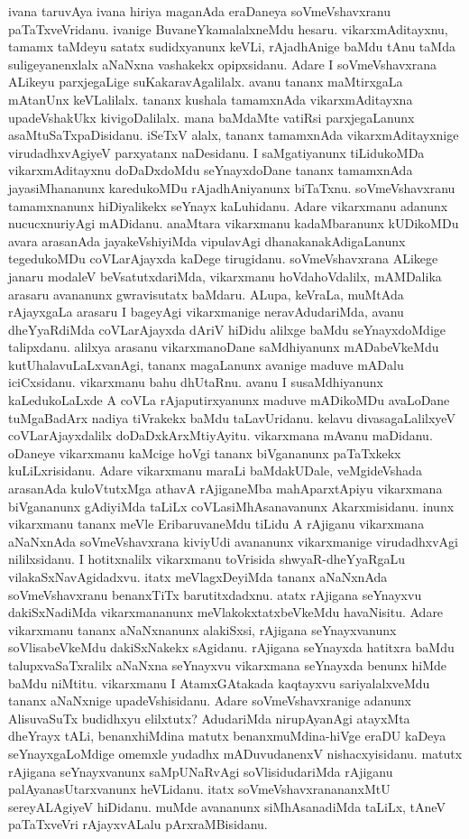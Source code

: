 \documentclass[11pt,a4size]{article}
\begin{document}
ivana taruvAya ivana hiriya maganAda eraDaneya soVmeVshavxranu
paTaTxveVridanu. ivanige BuvaneYkamalalxneMdu
hesaru. vikarxmAditayxnu, tamamx taMdeyu satatx sudidxyanunx keVLi,
rAjadhAnige baMdu tAnu taMda suligeyanenxlalx aNaNxna vashakekx
opipxsidanu. Adare I soVmeVshavxrana ALikeyu parxjegaLige
suKakaravAgalilalx. avanu tananx maMtirxgaLa mAtanUnx
keVLalilalx. tananx kushala tamamxnAda vikarxmAditayxna upadeVshakUkx
kivigoDalilalx. mana baMdaMte vatiRsi parxjegaLanunx
asaMtuSaTxpaDisidanu. iSeTxV alalx, tananx tamamxnAda
vikarxmAditayxnige virudadhxvAgiyeV parxyatanx naDesidanu. I
saMgatiyanunx tiLidukoMDa vikarxmAditayxnu doDaDxdoMdu seYnayxdoDane
tananx tamamxnAda jayasiMhananunx karedukoMDu rAjadhAniyanunx
biTaTxnu. soVmeVshavxranu tamamxnanunx hiDiyalikekx seYnayx
kaLuhidanu. Adare vikarxmanu adanunx nucucxnuriyAgi mADidanu. anaMtara
vikarxmanu kadaMbaranunx kUDikoMDu avara arasanAda jayakeVshiyiMda
vipulavAgi dhanakanakAdigaLanunx tegedukoMDu coVLarAjayxda kaDege
tirugidanu. soVmeVshavxrana ALikege janaru modaleV
beVsatutxdariMda, vikarxmanu hoVdahoVdalilx, mAMDalika arasaru
avananunx gwravisutatx baMdaru. ALupa, keVraLa, muMtAda rAjayxgaLa
arasaru I bageyAgi vikarxmanige neravAdudariMda, avanu dheYyaRdiMda
coVLarAjayxda dAriV hiDidu alilxge baMdu seYnayxdoMdige
talipxdanu. alilxya arasanu vikarxmanoDane saMdhiyanunx mADabeVkeMdu
kutUhalavuLaLxvanAgi, tananx magaLanunx avanige maduve mADalu
iciCxsidanu. vikarxmanu bahu dhUtaRnu. avanu I susaMdhiyanunx
kaLedukoLaLxde A coVLa rAjaputirxyanunx maduve mADikoMDu avaLoDane
tuMgaBadArx nadiya tiVrakekx baMdu taLavUridanu. kelavu
divasagaLalilxyeV coVLarAjayxdalilx doDaDxkArxMtiyAyitu. vikarxmana
mAvanu maDidanu. oDaneye vikarxmanu kaMcige hoVgi tananx biVgananunx
paTaTxkekx kuLiLxrisidanu. Adare vikarxmanu maraLi baMdakUDale,
veMgideVshada arasanAda kuloVtutxMga athavA rAjiganeMba mahAparxtApiyu
vikarxmana biVgananunx gAdiyiMda taLiLx coVLasiMhAsanavanunx
Akarxmisidanu. inunx vikarxmanu tananx meVle EribaruvaneMdu tiLidu A
rAjiganu vikarxmana aNaNxnAda soVmeVshavxrana kiviyUdi avananunx
vikarxmanige virudadhxvAgi nililxsidanu. I hotitxnalilx vikarxmanu
toVrisida shwyaR-dheYyaRgaLu vilakaSxNavAgidadxvu. itatx
meVlagxDeyiMda tananx aNaNxnAda soVmeVshavxranu benanxTiTx
barutitxdadxnu. atatx rAjigana seYnayxvu dakiSxNadiMda vikarxmananunx
meVlakokxtatxbeVkeMdu havaNisitu. Adare vikarxmanu tananx aNaNxnanunx
alakiSxsi, rAjigana seYnayxvanunx soVlisabeVkeMdu dakiSxNakekx
sAgidanu. rAjigana seYnayxda hatitxra baMdu talupxvaSaTxralilx aNaNxna
seYnayxvu vikarxmana seYnayxda benunx hiMde baMdu niMtitu. vikarxmanu
I AtamxGAtakada kaqtayxvu sariyalalxveMdu tananx aNaNxnige
upadeVshisidanu. Adare soVmeVshavxranige adanunx AlisuvaSuTx budidhxyu
elilxtutx? AdudariMda nirupAyanAgi atayxMta dheYrayx tALi,
benanxhiMdina matutx benanxmuMdina-hiVge eraDU kaDeya seYnayxgaLoMdige
omemxle yudadhx mADuvudanenxV nishacxyisidanu. matutx rAjigana
seYnayxvanunx saMpUNaRvAgi soVlisidudariMda rAjiganu
palAyanasUtarxvanunx heVLidanu. itatx soVmeVshavxranananxMtU
sereyALAgiyeV hiDidanu. muMde avananunx siMhAsanadiMda taLiLx, tAneV
paTaTxveVri rAjayxvALalu pArxraMBisidanu.
\end{document}
